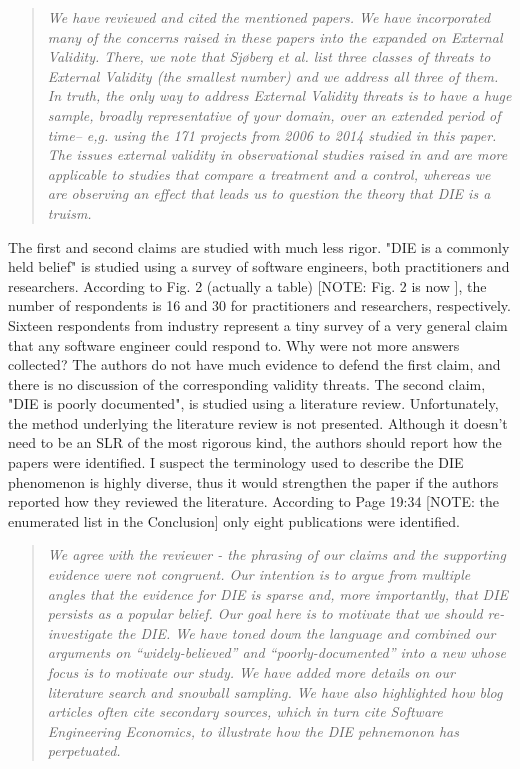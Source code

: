\begin{quote}{\em 
 We have reviewed and cited the mentioned papers. We have incorporated many of the concerns raised in these papers into the expanded  on External Validity.
 There, we note that Sj{\o}berg et al. list three classes of threats to External Validity (the smallest number) and we address all three of them. In truth, the only way to address External Validity threats is to have a huge sample, broadly representative of your domain, over an extended period of time-- e,g. using the 171 projects from 2006 to 2014 studied in this paper. The issues external validity in observational studies raised in \cite{madigan2014} and \cite{carlson2009} are more applicable to studies that compare a treatment and a control, whereas we are observing an effect that leads us to question the theory that DIE is a truism.
}\end{quote}

The first and second claims are studied with much less
rigor. "DIE is a commonly held belief" is studied using a
survey of software engineers, both practitioners and
researchers. According to Fig. 2 (actually a table) [NOTE: Fig. 2 is now ], the
number of respondents is 16 and 30 for practitioners and
researchers, respectively. Sixteen respondents from industry
represent a tiny survey of a very general claim that any
software engineer could respond to. Why were not more
answers collected? The authors do not have much evidence to
defend the first claim, and there is no discussion of the
corresponding validity threats. The second claim, "DIE is
poorly documented", is studied using a literature review.
Unfortunately, the method underlying the literature review
is not presented. Although it doesn't need to be an SLR of
the most rigorous kind, the authors should report how the
papers were identified. I suspect the terminology used to
describe the DIE phenomenon is highly diverse, thus it would
strengthen the paper if the authors reported how they
reviewed the literature. According to Page 19:34 [NOTE: the enumerated list in the Conclusion] only eight
publications were identified. 


\begin{quote}{\em We agree with the reviewer - the phrasing of our claims and the supporting evidence were not congruent. Our intention is to argue from multiple angles that the evidence for DIE is sparse and, more importantly, that DIE persists as a popular belief. Our goal here is to motivate that we should re-investigate the DIE. We have toned down the language and combined our arguments on ``widely-believed'' and ``poorly-documented'' into a new  whose focus is to motivate our study. We have added more details on our literature search and snowball sampling. We have also highlighted how blog articles often cite secondary sources, which in turn cite Software Engineering Economics, to illustrate how the DIE pehnemonon has perpetuated.}\end{quote}

